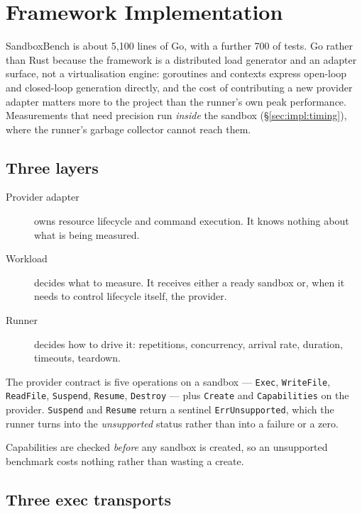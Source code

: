 \section{Framework Implementation}
\label{sec:implementation}

SandboxBench is about 5{,}100 lines of Go, with a further 700 of tests. Go rather than Rust because the
framework is a distributed load generator and an adapter surface, not a
virtualisation engine: goroutines and contexts express open-loop and
closed-loop generation directly, and the cost of contributing a new provider
adapter matters more to the project than the runner's own peak performance.
Measurements that need precision run \emph{inside} the sandbox
(\S\ref{sec:impl:timing}), where the runner's garbage collector cannot reach
them.

\subsection{Three layers}

\begin{description}
  \item[Provider adapter] owns resource lifecycle and command execution. It
  knows nothing about what is being measured.
  \item[Workload] decides what to measure. It receives either a ready sandbox
  or, when it needs to control lifecycle itself, the provider.
  \item[Runner] decides how to drive it: repetitions, concurrency, arrival
  rate, duration, timeouts, teardown.
\end{description}

The provider contract is five operations on a sandbox --- \texttt{Exec},
\texttt{WriteFile}, \texttt{ReadFile}, \texttt{Suspend}, \texttt{Resume},
\texttt{Destroy} --- plus \texttt{Create} and \texttt{Capabilities} on the
provider. \texttt{Suspend} and \texttt{Resume} return a sentinel
\texttt{ErrUnsupported}, which the runner turns into the \emph{unsupported}
status rather than into a failure or a zero.

Capabilities are checked \emph{before} any sandbox is created, so an
unsupported benchmark costs nothing rather than wasting a create.

\subsection{Three exec transports}
\label{sec:impl:transports}

